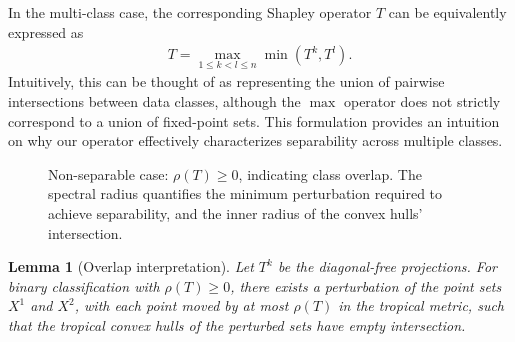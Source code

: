 \documentclass{article}
\newtheorem{lemma}[theorem]{Lemma}
\begin{document}
In the multi-class case, the corresponding Shapley operator $T$ can be equivalently expressed as
\begin{align}
T = \max_{1 \leq k < l \leq n}\min(T^k, T^l).
\end{align}
Intuitively, this can be thought of as representing the union of pairwise intersections between data classes, although the $\max$ operator does not strictly correspond to a union of fixed-point sets. This formulation provides an intuition on why our operator effectively characterizes separability across multiple classes.

\begin{figure}[htbp]
    \centering
    \resizebox{0.5\textwidth}{!}{\clipbox{0.15\width{} 0.15\height{} 0.15\width{} 0.15\height{}}{}}
    \caption{Non-separable case: $\rho(T) \geq 0$, indicating class overlap. The spectral radius quantifies the minimum perturbation required to achieve separability, and the inner radius of the convex hulls' intersection.}
    \label{fig:non_separable}
\end{figure}


\begin{lemma}[Overlap interpretation]\label{lemma:perturbation}
Let $T^k$ be the diagonal-free projections. For binary classification with $\rho(T) \geq 0$, there exists a perturbation of the point sets $X^1$ and $X^2$, with each point moved by at most $\rho(T)$ in the tropical metric, such that the tropical convex hulls of the perturbed sets have empty intersection.
\end{lemma}
\end{document}
